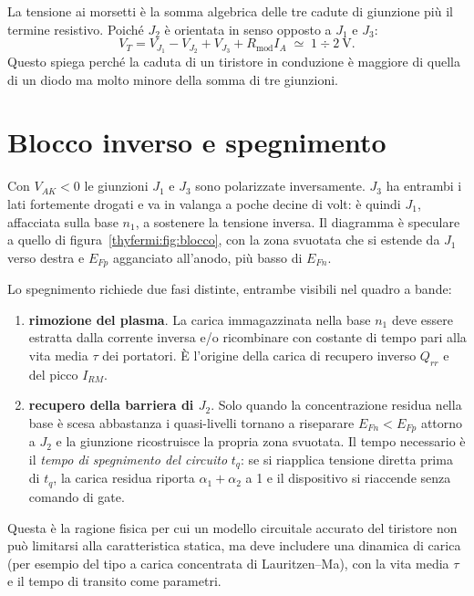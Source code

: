 La tensione ai morsetti è la somma algebrica delle tre cadute di giunzione più il
termine resistivo. Poiché $J_2$ è orientata in senso opposto a $J_1$ e $J_3$:
\begin{equation}
V_T = V_{J_1} - V_{J_2} + V_{J_3} + R_{\text{mod}} I_A \;\simeq\; 1\div 2~\text{V}.
\end{equation}
Questo spiega perché la caduta di un tiristore in conduzione è maggiore di quella
di un diodo ma molto minore della somma di tre giunzioni.

\section{Blocco inverso e spegnimento}

Con $V_{AK}<0$ le giunzioni $J_1$ e $J_3$ sono polarizzate inversamente. $J_3$ ha
entrambi i lati fortemente drogati e va in valanga a poche decine di volt: è
quindi $J_1$, affacciata sulla base $n_1$, a sostenere la tensione inversa. Il
diagramma è speculare a quello di figura~\ref{thyfermi:fig:blocco}, con la zona svuotata
che si estende da $J_1$ verso destra e $E_{Fp}$ agganciato all'anodo, più basso
di $E_{Fn}$.

Lo spegnimento richiede due fasi distinte, entrambe visibili nel quadro a bande:
\begin{enumerate}\itemsep2pt
  \item \textbf{rimozione del plasma}. La carica immagazzinata nella base $n_1$
        deve essere estratta dalla corrente inversa e/o ricombinare con costante
        di tempo pari alla vita media $\tau$ dei portatori. È l'origine della
        carica di recupero inverso $Q_{rr}$ e del picco $I_{RM}$.
  \item \textbf{recupero della barriera di $J_2$}. Solo quando la concentrazione
        residua nella base è scesa abbastanza i quasi-livelli tornano a
        riseparare $E_{Fn}<E_{Fp}$ attorno a $J_2$ e la giunzione ricostruisce la
        propria zona svuotata. Il tempo necessario è il \emph{tempo di spegnimento
        del circuito} $t_q$: se si riapplica tensione diretta prima di $t_q$, la
        carica residua riporta $\alpha_1+\alpha_2$ a 1 e il dispositivo si
        riaccende senza comando di gate.
\end{enumerate}
Questa è la ragione fisica per cui un modello circuitale accurato del tiristore
non può limitarsi alla caratteristica statica, ma deve includere una dinamica di
carica (per esempio del tipo a carica concentrata di Lauritzen--Ma), con la vita
media $\tau$ e il tempo di transito come parametri.

